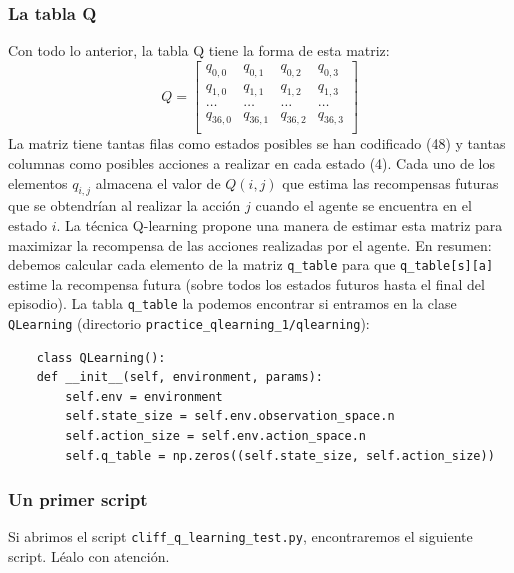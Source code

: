 \documentclass{article}
\begin{document}




\subsubsection{La tabla Q}
Con todo lo anterior, la tabla Q tiene la forma de esta matriz:
\begin{equation*}
    Q = \begin{bmatrix}
            q_{0,0} & q_{0,1} & q_{0,2} & q_{0,3}\\
            q_{1,0} & q_{1,1} & q_{1,2} & q_{1,3}\\
            \ldots & \ldots & \ldots & \ldots\\
            q_{36,0} & q_{36,1} & q_{36,2} & q_{36,3}\\
        \end{bmatrix}
\end{equation*}
La matriz tiene tantas filas como estados posibles se han codificado (48) y tantas columnas como posibles acciones a realizar en cada estado (4). Cada uno de los elementos $q_{i,j}$ almacena el valor de $Q(i, j)$ que estima las recompensas futuras que se obtendrían al realizar la acción $j$ cuando el agente se encuentra en el estado $i$. La técnica Q-learning propone una manera de estimar esta matriz para maximizar la recompensa de las acciones realizadas por el agente. En resumen: debemos calcular cada elemento de la matriz \texttt{q\_table} para que \texttt{q\_table[s][a]} estime la recompensa futura (sobre todos los estados
futuros hasta el final del episodio). La tabla \texttt{q\_table} la podemos encontrar si entramos en la clase \texttt{QLearning} (directorio \texttt{practice\_qlearning\_1/qlearning}):
\begin{verbatim}
    class QLearning():
    def __init__(self, environment, params):
        self.env = environment
        self.state_size = self.env.observation_space.n
        self.action_size = self.env.action_space.n
        self.q_table = np.zeros((self.state_size, self.action_size))
\end{verbatim}

\subsubsection{Un primer script}
Si abrimos el script \texttt{cliff\_q\_learning\_test.py}, encontraremos el siguiente script. Léalo con atención. 
\end{document}
